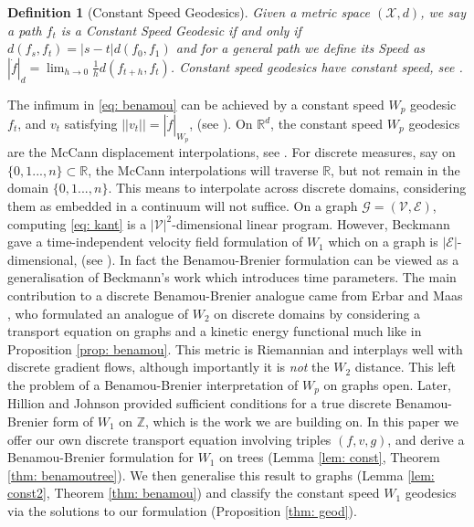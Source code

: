 \documentclass[conference]{IEEEtran}
\newcommand{\GG}{\mathcal{G}}
\newcommand{\VV}{\mathcal{V}}
\newcommand{\EE}{\mathcal{E}}
\newcommand{\XX}{\mathcal{X}}
\theoremstyle{ieeestyle}
\newtheorem{defn}{Definition}
\begin{document}
\begin{defn}[Constant Speed Geodesics]\label{defn: constant}
Given a metric space $(\XX,d)$, we say a path $f_t$ is a \textit{Constant Speed Geodesic} if and only if $d(f_s,f_t) = |s-t|d(f_0,f_1)$ and for a general path we define its \textit{Speed} as $|\dot{f}|_d = \lim_{h \rightarrow 0} \frac{1}{h}d(f_{t +h},f_t)$. Constant speed geodesics have constant speed, see \cite[Remark 7.7]{villani2008optimal}.
\end{defn}
The infimum in \eqref{eq: benamou} can be achieved by a constant speed $W_p$ geodesic $f_t$, and $v_t$ satisfying $||v_t|| = |\dot{f}|_{W_p}$, (see \cite{benamou2000computational}).\newline \newline
On $\mathbb{R}^d$, the constant speed $W_p$ geodesics are the McCann displacement interpolations, see \cite[Definition 1.1]{mccann1997convexity}. For discrete measures, say on $\{0,1...,n \} \subset \mathbb{R}$, the McCann interpolations will traverse $\mathbb{R}$, but not remain in the domain $\{0,1...,n \}$. This means to interpolate across discrete domains, considering them as embedded in a continuum will not suffice.
\newline \newline
On a graph $\GG = (\VV,\EE)$, computing \eqref{eq: kant} is a $|\VV|^2$-dimensional linear program. However, Beckmann \cite{beckmann1952continuous} gave a time-independent velocity field formulation of $W_1$ which on a graph is $|\EE|$-dimensional, (see \cite[Section 6.3]{peyre2019computational}). In fact the Benamou-Brenier formulation can be viewed as a generalisation of Beckmann's work which introduces time parameters.
\newline \newline
The main contribution to a discrete Benamou-Brenier analogue came from Erbar and Maas \cite{maas2011gradient}, who formulated an analogue of $W_2$ on discrete domains by considering a transport equation on graphs and a kinetic energy functional much like in Proposition \ref{prop: benamou}. This metric is Riemannian and interplays well  with discrete gradient flows, although importantly it is \textit{not} the $W_2$ distance. This left the problem of a Benamou-Brenier interpretation of $W_p$ on graphs open.
\newline \newline
Later, Hillion and Johnson \cite{hillion2016} provided sufficient conditions for a true discrete Benamou-Brenier form of $W_1$ on $\mathbb{Z}$, which is the work we are building on.
In this paper we offer our own discrete transport equation involving triples $(f,v,g)$, and derive a Benamou-Brenier formulation for $W_1$ on trees  (Lemma \ref{lem: const}, Theorem \ref{thm: benamoutree}). We then generalise this result to graphs (Lemma \ref{lem: const2}, Theorem \ref{thm: benamou}) and classify the constant speed $W_1$ geodesics via the solutions to our formulation (Proposition \ref{thm: geod}).
\end{document}
